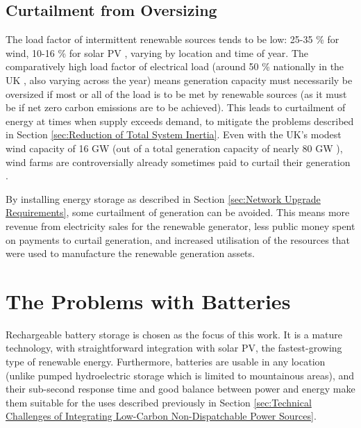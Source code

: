 \documentclass[report_18month.tex]{subfiles}
\begin{document}
\subsection{Curtailment from Oversizing}
The load factor of intermittent renewable sources tends to be low: 25-35 \% for wind, 10-16 \% for solar PV \cite{carbajales2014storage}, varying by location and time of year. The comparatively high load factor of electrical load (around 50 \% nationally in the UK \cite{gridwatch2017}, also varying across the year) means generation capacity must necessarily be oversized if most or all of the load is to be met by renewable sources (as it must be if net zero carbon emissions are to be achieved). This leads to curtailment of energy at times when supply exceeds demand, to mitigate the problems described in Section \ref{sec:Reduction of Total System Inertia}. Even with the UK's modest wind capacity of 16 GW \cite{beis2017renewables} (out of a total generation capacity of nearly 80 GW \cite{beis2017cap}), wind farms are controversially already sometimes paid to curtail their generation \cite{blake2017windcurtail}.

By installing energy storage as described in Section \ref{sec:Network Upgrade Requirements}, some curtailment of generation can be avoided. This means more revenue from electricity sales for the renewable generator, less public money spent on payments to curtail generation, and increased utilisation of the resources that were used to manufacture the renewable generation assets.

\section{The Problems with Batteries}
Rechargeable battery storage is chosen as the focus of this work. It is a mature technology, with straightforward integration with solar PV, the fastest-growing type of renewable energy. Furthermore, batteries are usable in any location (unlike pumped hydroelectric storage which is limited to mountainous areas), and their sub-second response time and good balance between power and energy \cite{luo2015overview} make them suitable for the uses described previously in Section \ref{sec:Technical Challenges of Integrating Low-Carbon Non-Dispatchable Power Sources}.
\end{document}
